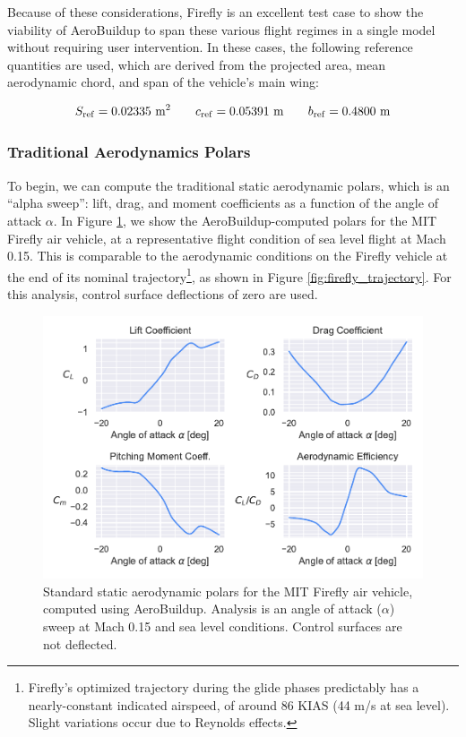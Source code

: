 Because of these considerations, Firefly is an excellent test case to show the viability of AeroBuildup to span these various flight regimes in a single model without requiring user intervention. In these cases, the following reference quantities are used, which are derived from the projected area, mean aerodynamic chord, and span of the vehicle's main wing:

\begin{equation}
    S_{\rm ref} = 0.02335\ \text{m}^2 \qquad c_{\rm ref} = 0.05391\ \text{m} \qquad b_{\rm ref} = 0.4800\ \text{m}
\end{equation}

\subsubsection{Traditional Aerodynamics Polars}

To begin, we can compute the traditional static aerodynamic polars, which is an ``alpha sweep'': lift, drag, and moment coefficients as a function of the angle of attack $\alpha$. In Figure \ref{fig:ab_polars}, we show the AeroBuildup-computed polars for the MIT Firefly air vehicle, at a representative flight condition of sea level flight at Mach 0.15. This is comparable to the aerodynamic conditions on the Firefly vehicle at the end of its nominal trajectory\footnote{Firefly's optimized trajectory during the glide phases predictably has a nearly-constant indicated airspeed, of around 86 KIAS (44 m/s at sea level). Slight variations occur due to Reynolds effects.}, as shown in Figure \ref{fig:firefly_trajectory}. For this analysis, control surface deflections of zero are used.

\begin{figure}[h]
    \centering
    \includegraphics[width=6in]{../figures/aerobuildup_figs/polars.pdf}
    \caption{Standard static aerodynamic polars for the MIT Firefly air vehicle, computed using AeroBuildup. Analysis is an angle of attack ($\alpha$) sweep at Mach 0.15 and sea level conditions. Control surfaces are not deflected.}
    \label{fig:ab_polars}
\end{figure}

